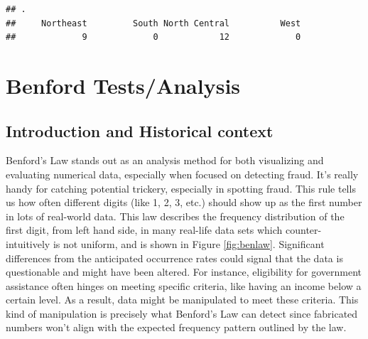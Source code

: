 \documentclass[
]{book}
\newenvironment{Shaded}{\begin{snugshade}}{\end{snugshade}}
\newcommand{\AttributeTok}[1]{\textcolor[rgb]{0.13,0.29,0.53}{#1}}
\newcommand{\CommentTok}[1]{\textcolor[rgb]{0.56,0.35,0.01}{\textit{#1}}}
\newcommand{\DecValTok}[1]{\textcolor[rgb]{0.00,0.00,0.81}{#1}}
\newcommand{\FunctionTok}[1]{\textcolor[rgb]{0.13,0.29,0.53}{\textbf{#1}}}
\newcommand{\NormalTok}[1]{#1}
\newcommand{\OtherTok}[1]{\textcolor[rgb]{0.56,0.35,0.01}{#1}}
\newcommand{\SpecialCharTok}[1]{\textcolor[rgb]{0.81,0.36,0.00}{\textbf{#1}}}
\begin{document}
\begin{Shaded}
\end{Shaded}

\begin{verbatim}
## .
##     Northeast         South North Central          West 
##             9             0            12             0
\end{verbatim}

\hypertarget{benford-testsanalysis}{%
\chapter{Benford Tests/Analysis}\label{benford-testsanalysis}}

\hypertarget{introduction-and-historical-context}{%
\section{Introduction and Historical context}\label{introduction-and-historical-context}}

Benford's Law stands out as an analysis method for both visualizing and evaluating numerical data, especially when focused on detecting fraud. It's really handy for catching potential trickery, especially in spotting fraud. This rule tells us how often different digits (like 1, 2, 3, etc.) should show up as the first number in lots of real-world data. This law describes the frequency distribution of the first digit, from left hand side, in many real-life data sets which counter-intuitively is not uniform, and is shown in Figure \ref{fig:benlaw}. Significant differences from the anticipated occurrence rates could signal that the data is questionable and might have been altered. For instance, eligibility for government assistance often hinges on meeting specific criteria, like having an income below a certain level. As a result, data might be manipulated to meet these criteria. This kind of manipulation is precisely what Benford's Law can detect since fabricated numbers won't align with the expected frequency pattern outlined by the law.
\end{document}
